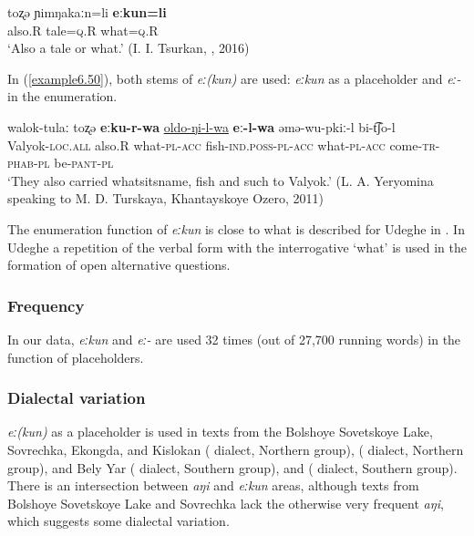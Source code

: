 \documentclass[output=paper,colorlinks,citecolor=brown]{langscibook}
\begin{document}
\ea
    \label{example6.49}
    \gll toʐə	ɲimŋakaːn=li	\textbf{eːkun=li}\\
    also.R	tale=\textsc{q}.R	what=\textsc{q}.R\\
    \glt `Also a tale or what.' (I. I. Tsurkan, , 2016)\\
    \z

In (\ref{example6.50}), both stems of \textit{eː(kun)} are used: \textit{eːkun} as a placeholder and \textit{eː-} in the enumeration.

\ea
    \label{example6.50}
    \gll walok-tulaː	toʐə	\textbf{eːku-r-wa}	\uline{oldo-ŋi-l-wa}	\textbf{eː-l-wa} əmə-wu-pkiː-l	bi-t͡ʃo-l\\
    Valyok-\textsc{loc.all}	also.R	what-\textsc{pl}-\textsc{acc}	fish-\textsc{ind.poss}-\textsc{pl}-\textsc{acc}	what-\textsc{pl}-\textsc{acc} come-\textsc{tr}-\textsc{phab}-\textsc{pl}	be-\textsc{pant}-\textsc{pl}\\
    \glt `They also carried whatsitsname, fish and such to Valyok.' (L. A. Yeryomina speaking to M. D. Turskaya, Khantayskoye Ozero, 2011)\\
    \z

The enumeration function of \textit{eːkun} is close to what is described for Udeghe in \citet{TolskayaTolskaya2008}. In Udeghe a repetition of the verbal form with the interrogative `what' is used in the formation of open alternative questions.


\subsubsection{Frequency}

In our data, \textit{eːkun} and \textit{eː-} are used 32 times (out of 27,700 running words) in the function of placeholders.


\subsubsection{Dialectal variation}

\textit{eː(kun)} as a placeholder is used in texts from the Bolshoye Sovetskoye Lake, Sovrechka, Ekongda, and Kislokan ( dialect, Northern group),  ( dialect, Northern group),  and Bely Yar ( dialect, Southern group), and  ( dialect, Southern group). There is an intersection between \textit{aŋi} and \textit{eːkun} areas, although texts from Bolshoye Sovetskoye Lake and Sovrechka lack the otherwise very frequent \textit{aŋi}, which suggests some dialectal variation.
\end{document}
